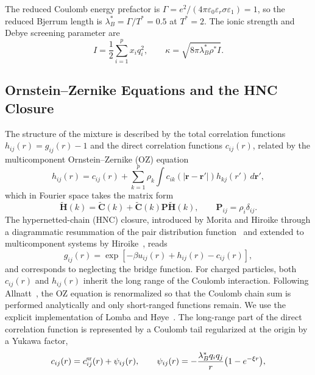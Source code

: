 \documentclass[aps,pre,twocolumn,superscriptaddress,floatfix]{revtex4-2}
\begin{document}
The reduced Coulomb energy prefactor is $\Gamma=e^2/(4\pi\varepsilon_0\varepsilon_r\sigma\varepsilon_1)=1$, so the reduced Bjerrum length is $\lambda_B^*=\Gamma/T^*=0.5$ at $T^*=2$. The ionic strength and Debye screening parameter are
\begin{equation}
I = \frac{1}{2} \sum_{i=1}^p x_i q_i^2,\qquad
\kappa = \sqrt{8\pi \lambda_B^* \rho^* I}.
\label{eq:debye_kappa}
\end{equation}

\subsection{Ornstein--Zernike Equations and the HNC Closure}

The structure of the mixture is described by the total correlation functions $h_{ij}(r) = g_{ij}(r) - 1$ and the direct correlation functions $c_{ij}(r)$, related by the multicomponent Ornstein--Zernike (OZ) equation~\cite{HansenMcDonald4th}
\begin{equation}
h_{ij}(r) = c_{ij}(r) + \sum_{k=1}^p \rho_k \int c_{ik}(|\mathbf{r} - \mathbf{r}'|) h_{kj}(r') \, d\mathbf{r}',
\label{eq:oz_relation}
\end{equation}
which in Fourier space takes the matrix form
\begin{equation}
\tilde{\mathbf{H}}(k) = \tilde{\mathbf{C}}(k) + \tilde{\mathbf{C}}(k) \mathbf{P} \tilde{\mathbf{H}}(k),\qquad \mathbf{P}_{ij} = \rho_i \delta_{ij}.
\label{eq:oz_matrix}
\end{equation}
The hypernetted-chain (HNC) closure, introduced by Morita and Hiroike through a diagrammatic resummation of the pair distribution function~\cite{Morita1960} and extended to multicomponent systems by Hiroike~\cite{Hiroike1960}, reads
\begin{equation}
g_{ij}(r) = \exp\left[ -\beta u_{ij}(r) + h_{ij}(r) - c_{ij}(r) \right],
\label{eq:hnc_closure}
\end{equation}
and corresponds to neglecting the bridge function. For charged particles, both $c_{ij}(r)$ and $h_{ij}(r)$ inherit the long range of the Coulomb interaction. Following Allnatt~\cite{Allnatt1964}, the OZ equation is renormalized so that the Coulomb chain sum is performed analytically and only short-ranged functions remain. We use the explicit implementation of Lomba and H{\o}ye~\cite{LombaHoye1992}. The long-range part of the direct correlation function is represented by a Coulomb tail regularized at the origin by a Yukawa factor,
\begin{equation}
c_{ij}(r)=c_{ij}^{\rm sr}(r)+\psi_{ij}(r),\qquad
\psi_{ij}(r)=-\frac{\lambda_B^* q_iq_j}{r}\bigl(1-e^{-\xi r}\bigr),
\label{eq:allnatt_split}
\end{equation}
\end{document}
